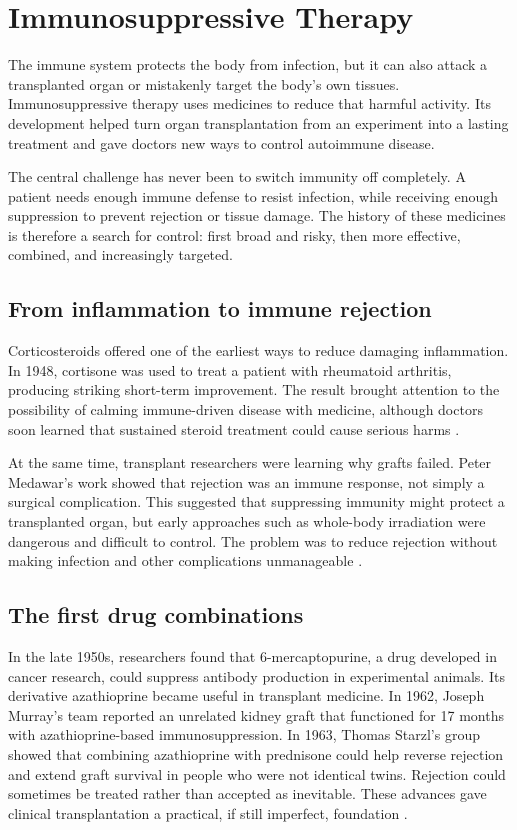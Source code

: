 \documentclass[12pt,oneside]{book}
\begin{document}
\chapter[Immunosuppressive Therapy]{Immunosuppressive Therapy}

The immune system protects the body from infection, but it can also attack a
transplanted organ or mistakenly target the body's own tissues. Immunosuppressive
therapy uses medicines to reduce that harmful activity. Its development
helped turn organ transplantation from an experiment into a lasting treatment
and gave doctors new ways to control autoimmune disease.

The central challenge has never been to switch immunity off completely. A
patient needs enough immune defense to resist infection, while receiving
enough suppression to prevent rejection or tissue damage. The history of
these medicines is therefore a search for control: first broad and risky,
then more effective, combined, and increasingly targeted.

\section{From inflammation to immune rejection}
Corticosteroids offered one of the earliest ways to reduce damaging
inflammation. In 1948, cortisone was used to treat a patient with rheumatoid
arthritis, producing striking short-term improvement. The result brought
attention to the possibility of calming immune-driven disease with medicine,
although doctors soon learned that sustained steroid treatment could cause
serious harms \cite{cortisoneMayo}.

At the same time, transplant researchers were learning why grafts failed.
Peter Medawar's work showed that rejection was an immune response, not simply
a surgical complication. This suggested that suppressing immunity might
protect a transplanted organ, but early approaches such as whole-body
irradiation were dangerous and difficult to control. The problem was to
reduce rejection without making infection and other complications
unmanageable \cite{starzlEarlyTransplant,renalTransplantDevelopment}.

\section{The first drug combinations}
In the late 1950s, researchers found that 6-mercaptopurine, a drug developed
in cancer research, could suppress antibody production in experimental
animals. Its derivative azathioprine became useful in transplant medicine.
In 1962, Joseph Murray's team reported an unrelated kidney graft that
functioned for 17 months with azathioprine-based immunosuppression. In 1963,
Thomas Starzl's group showed that combining azathioprine with prednisone
could help reverse rejection and extend graft survival in people who were
not identical twins. Rejection could sometimes be treated rather than
accepted as inevitable. These advances gave clinical transplantation a
practical, if still imperfect, foundation \cite{renalTransplantDevelopment}.
\end{document}
